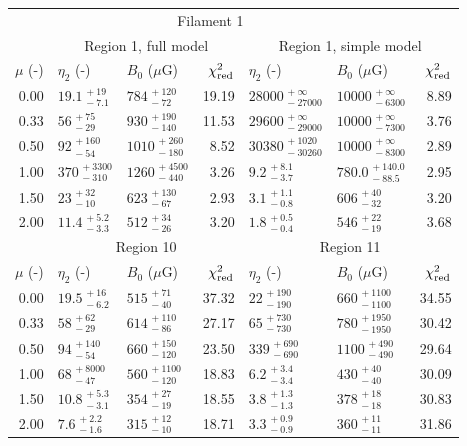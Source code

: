\begin{tabular}{@{}rllr llr@{}}

\toprule
\multicolumn{6}{c}{Filament 1} \\
\cmidrule{1-7}
{} & \multicolumn{3}{c}{Region 1, full model\tablenotemark{a}}
   & \multicolumn{3}{c}{Region 1, simple model} \\
\cmidrule(lr){2-4} \cmidrule(l){5-7}
$\mu$ (-) & $\eta_2$ (-) & $B_0$ ($\mu$G) & $\chi^2_{\mathrm{red}}$
          & $\eta_2$ (-) & $B_0$ ($\mu$G) & $\chi^2_{\mathrm{red}}$ \\
\cmidrule{1-7}
0.00 & ${19.1}^{\,+19}_{\,-7.1}$ & ${784}^{\,+120}_{\,-72}$ & 19.19
     & ${28000}^{\,+\infty}_{\,-27000}$ & ${10000}^{\,+\infty}_{\,-6300}$ & 8.89 \\
0.33 & ${56}^{\,+75}_{\,-29}$ & $930^{\,+190}_{\,-140}$ & 11.53
     & ${29600}^{\,+\infty}_{\,-29000}$ & ${10000}^{\,+\infty}_{\,-7300}$ & 3.76 \\
0.50 & ${92}^{\,+160}_{\,-54}$ & ${1010}^{\,+260}_{\,-180}$ & 8.52
     & ${30380}^{\,+1020}_{\,-30260}$ & ${10000}^{\,+\infty}_{\,-8300}$ & 2.89 \\
1.00 & ${370}^{\,+3300}_{\,-310}$ & ${1260}^{\,+4500}_{\,-440}$ & 3.26
     & ${9.2}^{\,+8.1}_{\,-3.7}$ & ${780.0}^{\,+140.0}_{\,-88.5}$ & 2.95 \\
1.50 & ${23}^{\,+32}_{\,-10}$ & ${623}^{\,+130}_{\,-67}$ & 2.93
     & ${3.1}^{\,+1.1}_{\,-0.8}$ & ${606}^{\,+40}_{\,-32}$ & 3.20 \\
2.00 & ${11.4}^{\,+5.2}_{\,-3.3}$ & ${512}^{\,+34}_{\,-26}$ & 3.20
     & ${1.8}^{\,+0.5}_{\,-0.4}$ & ${546}^{\,+22}_{\,-19}$ & 3.68 \\

\cmidrule{1-7}
{} & \multicolumn{3}{c}{Region 10}
   & \multicolumn{3}{c}{Region 11\tablenotemark{b}} \\
\cmidrule(lr){2-4} \cmidrule(l){5-7}
$\mu$ (-) & $\eta_2$ (-) & $B_0$ ($\mu$G) & $\chi^2_{\mathrm{red}}$
          & $\eta_2$ (-) & $B_0$ ($\mu$G) & $\chi^2_{\mathrm{red}}$ \\
\cmidrule{1-7}
0.00 & ${19.5}^{\,+16}_{\,-6.2}$ & ${515}^{\,+71}_{\,-40}$      & 37.32
     & $22^{\,+190}_{\,-190}$ & $660^{\,+1100}_{\,-1100}$       & 34.55 \\
0.33 & ${58}^{\,+62}_{\,-29}$ & ${614}^{\,+110}_{\,-86}$        & 27.17
     & $65^{\,+730}_{\,-730}$ & $780^{\,+1950}_{\,-1950}$       & 30.42 \\
0.50 & ${94}^{\,+140}_{\,-54}$ & $660^{\,+150}_{\,-120}$        & 23.50
     & $339^{\,+690}_{\,-690}$ & $1100^{\,+490}_{\,-490}$       & 29.64 \\
1.00 & ${68}^{\,+8000}_{\,-47}$ & $560^{\,+1100}_{\,-120}$      & 18.83
     & ${6.2}^{\,+3.4}_{\,-3.4}$ & $430^{\,+40}_{\,-40}$        & 30.09 \\
1.50 & ${10.8}^{\,+5.3}_{\,-3.1}$ & ${354}^{\,+27}_{\,-19}$     & 18.55
     & ${3.8}^{\,+1.3}_{\,-1.3}$ & ${378}^{\,+18}_{\,-18}$      & 30.83 \\
2.00 & ${7.6}^{\,+2.2}_{\,-1.6}$ & ${315}^{\,+12}_{\,-10}$      & 18.71
     & ${3.3}^{\,+0.9}_{\,-0.9}$ & ${360}^{\,+11}_{\,-11}$      & 31.86 \\


\end{tabular}
